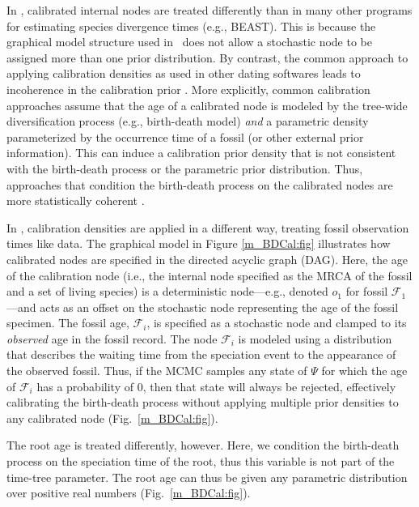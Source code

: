 In \RevBayes, calibrated internal nodes are treated differently than in many other programs for estimating species divergence times (e.g., BEAST).
This is because the graphical model structure used in \RevBayes~does not allow a stochastic node to be assigned more than one prior distribution. 
By contrast, the common approach to applying calibration densities as used in other dating softwares leads to incoherence in the calibration prior \citep[for detailed explainations of this see][]{warnock12,heled12,heath2013fossilized}. 
More explicitly, common calibration approaches assume that the age of a calibrated node is modeled by the tree-wide diversification process (e.g., birth-death model) \textit{and} a parametric density parameterized by the occurrence time of a fossil (or other external prior information).
This can induce a calibration prior density that is not consistent with the birth-death process or the parametric prior distribution. 
Thus, approaches that condition the birth-death process on the calibrated nodes are more statistically coherent \citep{yang06}.

In \RevBayes, calibration densities are applied in a different way, treating fossil observation times like data. 
The graphical model in Figure \ref{m_BDCal:fig} illustrates how calibrated nodes are specified in the directed acyclic graph (DAG).
Here, the age of the calibration node (i.e., the internal node specified as the MRCA of the fossil and a set of living species) is a deterministic node---e.g., denoted $o_1$ for fossil $\mathcal{F}_1$---and acts as an offset on the stochastic node representing the age of the fossil specimen.
The fossil age, $\mathcal{F}_i$, is specified as a stochastic node and clamped to its \textit{observed} age in the fossil record. 
The node $\mathcal{F}_i$ is modeled using a distribution that describes the waiting time from the speciation event to the appearance of the observed fossil. 
Thus, if the MCMC samples any state of $\Psi$ for which the age of $\mathcal{F}_i$ has a probability of 0, then that state will always be rejected, effectively calibrating the birth-death process without applying multiple prior densities to any calibrated node (Fig.~\ref{m_BDCal:fig}).

The root age is treated differently, however. 
Here, we condition the birth-death process on the speciation time of the root, thus this variable is not part of the time-tree parameter. 
The root age can thus be given any parametric distribution over positive real numbers (Fig.~\ref{m_BDCal:fig}).

